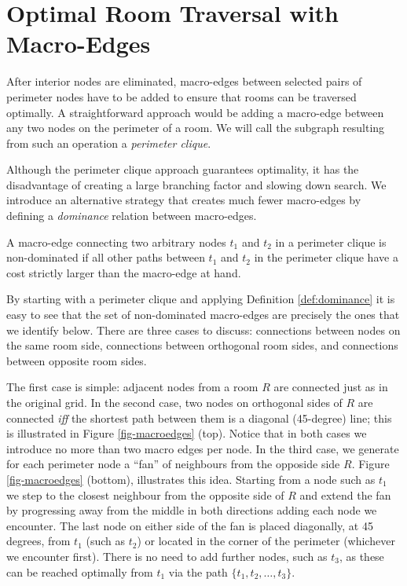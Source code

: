\section{Optimal Room Traversal with Macro-Edges}

After interior nodes are eliminated, macro-edges between selected pairs of
perimeter nodes have to be added to ensure that rooms can be traversed
optimally.  A straightforward approach would be adding a macro-edge between any
two nodes on the perimeter of a room.  We will call the subgraph resulting from
such an operation a \emph{perimeter clique}.

Although the perimeter clique approach guarantees optimality, it has the
disadvantage of creating a large branching factor and slowing down search.  We
introduce an alternative strategy that creates much fewer macro-edges by
defining a \emph{dominance} relation between macro-edges.
%

\begin{definition}
\label{def:dominance}
A macro-edge connecting two arbitrary nodes $t_1$ and $t_2$ in a perimeter
clique is non-dominated if all other paths between $t_1$ and $t_2$ in the
perimeter clique have a cost strictly larger than the macro-edge at hand.
\end{definition}

By starting with a perimeter clique and applying Definition \ref{def:dominance} it
is easy to see that the set of non-dominated macro-edges are precisely the ones
that we identify below.  There are three cases to discuss: connections between
nodes on the same room side, connections between orthogonal room sides, and
connections between opposite room sides.

The first case is simple: adjacent nodes from a room $R$ are connected just as
in the original grid.  In the second case, two nodes on orthogonal sides of $R$
are connected \emph{iff} the shortest path between them is a diagonal
(45-degree) line; this is illustrated in Figure \ref{fig-macroedges} (top).
Notice that in both cases we introduce no more than two macro edges per node.
In the third case, we generate for each perimeter node a ``fan'' of neighbours
from the opposide side $R$.  Figure \ref{fig-macroedges} (bottom), illustrates
this idea.  Starting from a node such as $t_{1}$ we step to the closest
neighbour from the opposite side of $R$ and extend the fan by progressing away
from the middle in both directions adding each node we encounter.  The last node
on either side of the fan is placed diagonally, at 45 degrees, from $t_{1}$
(such as $t_{2}$) or located in the corner of the perimeter (whichever we
encounter first).  There is no need to add further nodes, such as $t_{3}$, as
these can be reached optimally from $t_1$ via the path $\lbrace t_1, t_2, \dots,
t_3\rbrace$.

